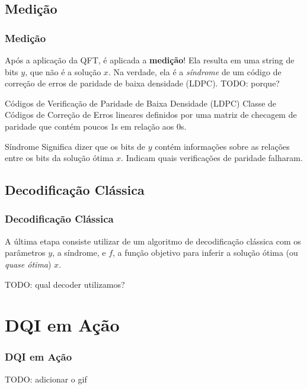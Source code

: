 \documentclass[aspectratio=169]{beamer}
\begin{document}
\subsection{Medição}
\begin{frame}
  \frametitle{Medição}

  Após a aplicação da QFT, é aplicada a \textbf{medição}! 
  \vfill
  Ela resulta em uma string de bits $y$, que não é a solução $x$. 
  Na verdade, ela é a \textit{síndrome} de um código de correção de erros de paridade de baixa densidade (LDPC).
  TODO: porque?
  
  \vfill
  \begin{block}{Códigos de Verificação de Paridade de Baixa Densidade (LDPC)}
    Classe de Códigos de Correção de Erros lineares definidos por uma matriz de checagem de paridade que contém poucos 1s em relação aos 0s.
  \end{block}

  \begin{block}{Síndrome}
    Significa dizer que os bits de $y$ contém informações sobre as relações entre os bits da solução ótima $x$. Indicam quais verificações de paridade falharam.
  \end{block}
\end{frame}

\subsection{Decodificação Clássica}
\begin{frame}[fragile]
  \frametitle{Decodificação Clássica}

  A última etapa consiste utilizar de um algoritmo de decodificação clássica com os parâmetros $y$, a síndrome, e $f$, a função objetivo para inferir a solução ótima (ou \textit{quase ótima}) $x$.

  \vfill

  TODO: qual decoder utilizamos?

\end{frame}

\section{DQI em Ação}
\begin{frame}
  \frametitle{DQI em Ação}

  TODO: adicionar o gif
  
\end{frame}
\end{document}
